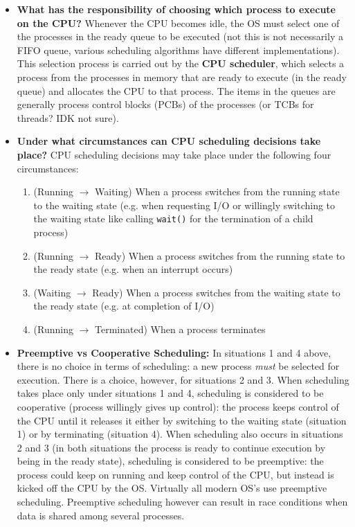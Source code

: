 \documentclass[12pt]{article}
\begin{document}
\begin{itemize}
    \item \textbf{What has the responsibility of choosing which process to execute on the CPU?} Whenever the CPU becomes idle, the OS must select one of the processes in the ready queue to be executed (not this is not necessarily a FIFO queue, various scheduling algorithms have different implementations). This selection process is carried out by the \textbf{CPU scheduler}, which selects a process from the processes in memory that are ready to execute (in the ready queue) and allocates the CPU to that process. The items in the queues are generally process control blocks (PCBs) of the processes (or TCBs for threads? IDK not sure).
    \item \textbf{Under what circumstances can CPU scheduling decisions take place?} CPU scheduling decisions may take place under the following four circumstances:
        \begin{enumerate}
            \item (Running \(\rightarrow\) Waiting) When a process switches from the running state to the waiting state (e.g. when requesting I/O or willingly switching to the waiting state like calling \texttt{wait()} for the termination of a child process)
            \item (Running \(\rightarrow\) Ready) When a process switches from the running state to the ready state (e.g. when an interrupt occurs)
            \item (Waiting \(\rightarrow\) Ready) When a process switches from the waiting state to the ready state (e.g. at completion of I/O)
            \item (Running \(\rightarrow\) Terminated) When a process terminates
        \end{enumerate}
    \item \textbf{Preemptive vs Cooperative Scheduling:} In situations 1 and 4 above, there is no choice in terms of scheduling: a new process \textit{must} be selected for execution. There is a choice, however, for situations 2 and 3. When scheduling takes place only under situations 1 and 4, scheduling is considered to be cooperative (process willingly gives up control): the process keeps control of the CPU until it releases it either by switching to the waiting state (situation 1) or by terminating (situation 4). When scheduling also occurs in situations 2 and 3 (in both situations the process is ready to continue execution by being in the ready state), scheduling is considered to be preemptive: the process could keep on running and keep control of the CPU, but instead is kicked off the CPU by the OS. Virtually all modern OS's use preemptive scheduling. Preemptive scheduling however can result in race conditions when data is shared among several processes.

\end{itemize}
\end{document}
